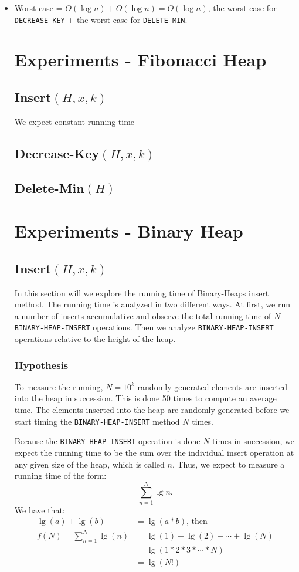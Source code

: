 \documentclass[a4paper,oneside,11pt]{article}
\begin{document}
\begin{itemize}
  \item{Worst case} = $O(\log n) + O(\log n) = O(\log n)$, the worst case for \texttt{DECREASE-KEY} + the worst case for \texttt{DELETE-MIN}.

\section*{Experiments - Fibonacci Heap}
\subsection*{Insert$(H,x,k)$}
We expect constant running time 

\subsection*{Decrease-Key$(H,x,k)$}

\subsection*{Delete-Min$(H)$}

\section*{Experiments - Binary Heap}
\subsection*{Insert$(H,x,k)$}
In this section will we explore the running time of Binary-Heaps insert method. The running time is analyzed in two different ways. At first, we run a number of inserts accumulative and observe the total running time of $N$ \texttt{BINARY-HEAP-INSERT} operations. Then we analyze \texttt{BINARY-HEAP-INSERT} operations relative to the height of the heap.
\subsubsection*{Hypothesis}
To measure the running, $N=10^k$ randomly generated elements are inserted into the heap in succession. This is done 50 times to compute an average time. The elements inserted into the heap are randomly generated before we start timing the \texttt{BINARY-HEAP-INSERT} method $N$ times.

Because the \texttt{BINARY-HEAP-INSERT} operation is done $N$ times in succession, we expect the running time to be the sum over the individual insert operation at any given size of the heap, which is called $n$.
Thus, we expect to measure a running time of the form: \[\sum^N_{n=1}\lg n.\]
We have that:
\begin{align*}
  \lg(a)+\lg(b)&=\lg(a*b)\text{, then}\\
  f(N)=\sum^N_{n=1}\lg(n)&=\lg(1)+\lg(2)+\cdots+\lg(N)\\
  &=\lg(1*2*3*\cdots *N)\\
  &=\lg(N!)
\end{align*}


\end{itemize}
\end{document}
